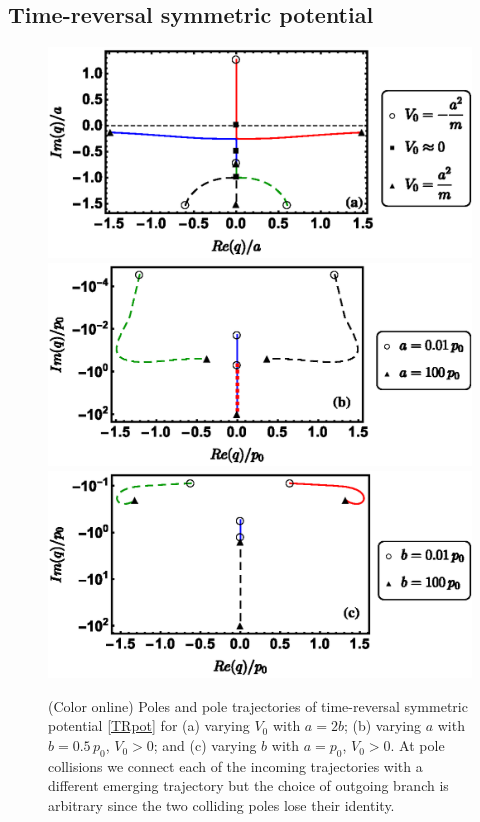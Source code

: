\subsection{Time-reversal symmetric potential}
%
%
\begin{figure}[h]
	\includegraphics[width=1.0\linewidth]{Figures/VSymEigenvalsVaryingV0_Momentum.eps}
	\includegraphics[width=1.0\linewidth]{Figures/VSymEigenvalsVaryingA_Momentum_Log.eps}
	\includegraphics[width=1.0\linewidth]{Figures/VSymEigenvalsVaryingB_Momentum_Log.eps}
	\caption{(Color online) Poles and pole trajectories of time-reversal symmetric potential \eqref{TRpot} for (a) varying $V_0$ with $a=2 b$; (b) varying $a$ with $b=0.5\, p_0$, $V_0>0$; and (c) varying $b$ with $a=p_0$,
	$V_0>0$. At pole collisions we connect each of the incoming trajectories with a different emerging trajectory but the choice of outgoing branch  is arbitrary since the two colliding poles lose their identity.}
	\label{fig:VSymEigenvals}
\end{figure}

